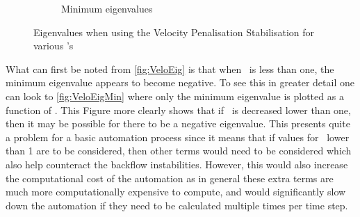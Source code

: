 \begin{figure}[ht]
\begin{subfigure}[h]{0.49\textwidth}
        \caption{Minimum eigenvalues\label{fig:VeloEigMin}}
     \end{subfigure}
        \caption{Eigenvalues when using the Velocity Penalisation Stabilisation for various \mbeta's}
        \label{fig:VeloEigmulti}
\end{figure}
What can first be noted from \autoref{fig:VeloEig} is that when \mbeta~is less than one, the minimum eigenvalue appears to become negative. To see this in greater detail one can look to \autoref{fig:VeloEigMin} where only the minimum eigenvalue is plotted as a function of \mbeta. This Figure more clearly shows that if \mbeta~is decreased lower than one, then it may be possible for there to be a negative eigenvalue. This presents quite a problem for a basic automation process since it means that if values for \mbeta~lower than 1 are to be considered, then other terms would need to be considered which also help counteract the backflow instabilities. However, this would also increase the computational cost of the automation as in general these extra terms are much more computationally expensive to compute, and would significantly slow down the automation if they need to be calculated multiple times per time step.

